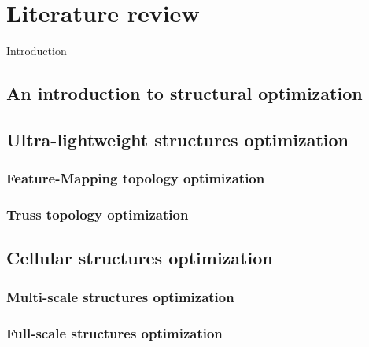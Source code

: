 \setchapterpreamble[u]{\margintoc}
\chapter{Literature review}
Introduction
\section{An introduction to structural optimization}

\section{Ultra-lightweight structures optimization}

\subsection{Feature-Mapping topology optimization}

\subsection{Truss topology optimization}

\section{Cellular structures optimization}

\subsection{Multi-scale structures optimization}

\subsection{Full-scale structures optimization}